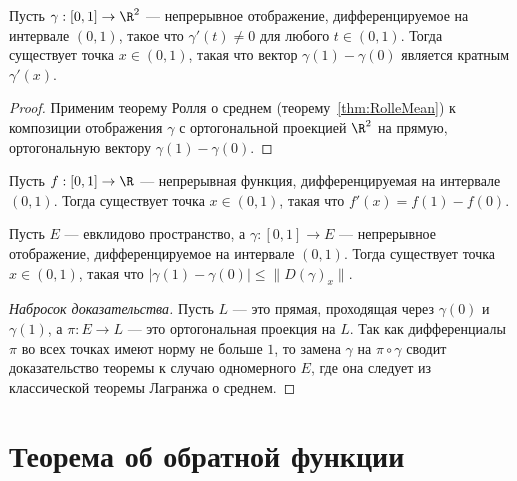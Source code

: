 \documentclass[
	extrafontsizes,
	11pt,
	hyphens,
]{memoir}
\begin{document}
\begin{theorem}
Пусть \(\gamma : [0,1] \to \R^2\) --- непрерывное отображение, дифференцируемое на интервале \((0,1)\), такое что \(\gamma'(t) \neq 0\) для любого \(t \in (0,1)\).%
\label{thm:CauchyMean}
Тогда существует точка \(x \in (0,1)\), такая что вектор \(\gamma(1) - \gamma(0)\) является кратным \(\gamma'(x)\).
\end{theorem}

\begin{proof}
Применим теорему Ролля о среднем (теорему~\ref{thm:RolleMean}) к композиции отображения \(\gamma\) с ортогональной проекцией \(\R^2\) на прямую, ортогональную вектору \(\gamma(1) - \gamma(0)\).
\end{proof}

\begin{corollary}
Пусть \(f : [0,1] \to \R\) --- непрерывная функция, дифференцируемая на интервале \((0,1)\).%
\label{cor:LagrangeMean}
Тогда существует точка \(x \in (0,1)\), такая что \(f'(x) = f(1) - f(0)\).
\end{corollary}

\begin{theorem}
Пусть \(E\) --- евклидово пространство, а \(\gamma : [0,1] \to E\) --- непрерывное отображение, дифференцируемое на интервале \((0,1)\).%
Тогда существует точка \(x \in (0,1)\), такая что \(|\gamma(1) - \gamma(0)| \leq \lVert D(\gamma)_x \rVert\).
\end{theorem}

\begin{proof}[Набросок доказательства]
Пусть \(L\) --- это прямая, проходящая через \(\gamma(0)\) и \(\gamma(1)\), а \(\pi : E \to L\) --- это ортогональная проекция на \(L\). Так как дифференциалы \(\pi\) во всех точках имеют норму не больше \(1\), то замена \(\gamma\) на \(\pi \circ \gamma\) сводит доказательство теоремы к случаю одномерного \(E\), где она следует из классической теоремы Лагранжа о среднем.
\end{proof}


\section{Теорема об обратной функции}

\end{document}
